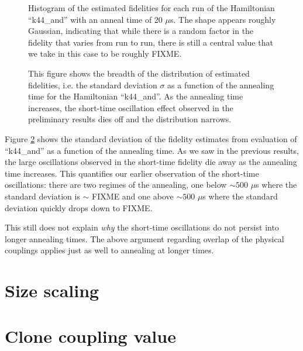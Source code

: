 \begin{figure}
	\caption[Estimated Fidelity Histogram]{Histogram of the estimated fidelities for each run of the Hamiltonian ``k44\_and'' with an anneal time of 20 $\mu$s.  The shape appears roughly Gaussian, indicating that while there is a random factor in the fidelity that varies from run to run, there is still a central value that we take in this case to be roughly FIXME.}
	\label{fig:hist}
\end{figure}

\begin{figure}
	\caption[Fidelity Distribution vs. Time]{This figure shows the breadth of the distribution of estimated fidelities, i.e. the standard deviation $\sigma$ as a function of the annealing time for the Hamiltonian ``k44\_and''.  As the annealing time increases, the short-time oscillation effect observed in the preliminary results dies off and the distribution narrows.}
	\label{fig:std_time}
\end{figure}

Figure \ref{fig:std_time} shows the standard deviation of the fidelity estimates from evaluation of ``k44\_and'' as a function of the annealing time.  As we saw in the previous results, the large oscillations observed in the short-time fidelity die away as the annealing time increases.  This quantifies our earlier observation of the short-time oscillations: there are two regimes of the annealing, one below $\sim 500$ $\mu$s where the standard deviation is $\sim$ FIXME and one above $\sim 500$ $\mu$s where the standard deviation quickly drops down to FIXME.

This still does not explain \emph{why} the short-time oscillations do not persist into longer annealing times.  The above argument regarding overlap of the physical couplings applies just as well to annealing at longer times.


\section{Size scaling}

\section{Clone coupling value}
